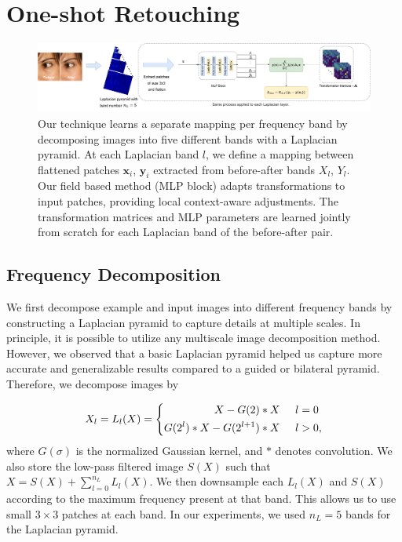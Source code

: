\section{One-shot Retouching}
\label{sec:Methodology}


\begin{landscape}
\begin{figure}[th] %
	\centering
	\includegraphics[width=1.5\textwidth]{Chapters/detail-retouching-figs/MainFig.pdf}
    \caption{Our technique learns a separate mapping per frequency band by decomposing images into five different bands with a Laplacian pyramid. At each Laplacian band $l$, we define a mapping between flattened patches $\mathbf{x}_i$, $\mathbf{y}_i$ extracted from before-after bands $X_l$, $Y_l$. Our field based method (MLP block) adapts transformations to input patches, providing local context-aware adjustments. The transformation matrices and MLP parameters are learned jointly from scratch for each Laplacian band of the before-after pair.}

\label{fig:modelT}
\end{figure}
 \end{landscape}


\subsection{Frequency Decomposition}\label{sec:thePatchMap}

We first decompose example and input images into different frequency bands by constructing a Laplacian pyramid to capture details at multiple scales. In principle, it is possible to utilize any multiscale image decomposition method. However, we observed that a basic Laplacian pyramid helped us capture more accurate and generalizable results compared to a guided or bilateral pyramid. Therefore, we decompose images by

\begin{equation} 
	X_l = L_l(X) = 
 \left \{ \begin{aligned}
        X - G(2) \ast X \hspace{5mm} &l=0\\
        G(2^l) \ast X - G(2^{l+1}) \ast X \hspace{5mm} &l>0,
       \end{aligned}
 \right.
\end{equation}
where $G(\sigma)$ is the normalized Gaussian kernel, and $\ast$ denotes convolution. We also store the low-pass filtered image $S(X)$ such that $X = S(X) + \sum_{l=0}^{n_L} L_l(X)$. We then downsample each $L_l(X)$ and $S(X)$ according to the maximum frequency present at that band. This allows us to use small $3 \times 3$ patches at each band. In our experiments, we used $n_L = 5$ bands for the Laplacian pyramid.


